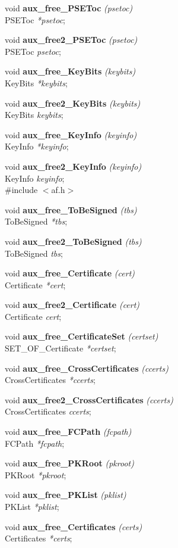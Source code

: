 void {\bf aux\_free\_PSEToc} {\em (psetoc)} \\
PSEToc {\em **psetoc};

void {\bf aux\_free2\_PSEToc} {\em (psetoc)} \\
PSEToc {\em *psetoc};

void {\bf aux\_free\_KeyBits} {\em (keybits)} \\
KeyBits {\em **keybits};

void {\bf aux\_free2\_KeyBits} {\em (keybits)} \\
KeyBits {\em *keybits};

void {\bf aux\_free\_KeyInfo} {\em (keyinfo)} \\
KeyInfo {\em **keyinfo};

void {\bf aux\_free2\_KeyInfo} {\em (keyinfo)} \\
KeyInfo {\em *keyinfo};
\\[1em]
\#include $<$af.h$>$ 

void {\bf aux\_free\_ToBeSigned} {\em (tbs)} \\
ToBeSigned {\em **tbs};

void {\bf aux\_free2\_ToBeSigned} {\em (tbs)} \\
ToBeSigned {\em *tbs};

void {\bf aux\_free\_Certificate} {\em (cert)} \\
Certificate {\em **cert};

void {\bf aux\_free2\_Certificate} {\em (cert)} \\
Certificate {\em *cert};

void {\bf aux\_free\_CertificateSet} {\em (certset)} \\
SET\_OF\_Certificate {\em **certset};

void {\bf aux\_free\_CrossCertificates} {\em (ccerts)} \\
CrossCertificates {\em **ccerts};

void {\bf aux\_free2\_CrossCertificates} {\em (ccerts)} \\
CrossCertificates {\em *ccerts};

void {\bf aux\_free\_FCPath} {\em (fcpath)} \\
FCPath {\em **fcpath};

void {\bf aux\_free\_PKRoot} {\em (pkroot)} \\
PKRoot {\em **pkroot};

void {\bf aux\_free\_PKList} {\em (pklist)} \\
PKList {\em **pklist};

void {\bf aux\_free\_Certificates} {\em (certs)} \\
Certificates {\em **certs};

